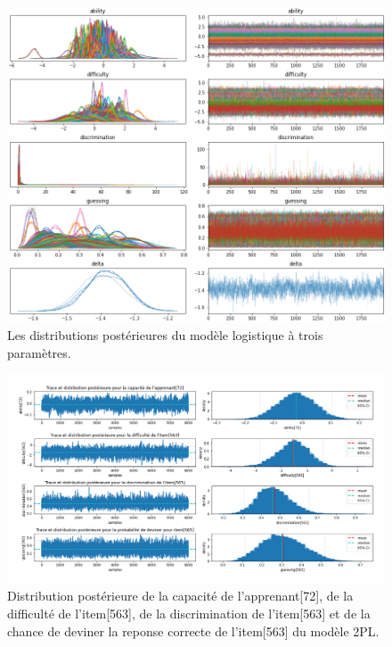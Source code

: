 \begin{figure}[H]
	\begin{center}
		\includegraphics[width=\textwidth]{images/annexe/model_plot-trace3.png}
	\end{center}
	\caption{Les distributions postérieures du modèle logistique à trois paramètres.}
	\label{model_trace-plot3}
\end{figure}

\begin{figure}[H]
	\begin{center}
		\includegraphics[width=\textwidth]{images/annexe/params_posterior_distribution3.png}
	\end{center}
	\caption{Distribution postérieure de la capacité de l’apprenant[72], de la difficulté de l’item[563], de la discrimination de l’item[563] et de la chance de deviner la reponse correcte de l'item[563] du modèle 2PL.}
	\label{params_posterior_distribution_3pl}
\end{figure}